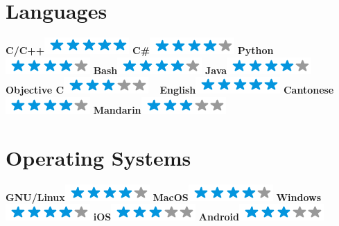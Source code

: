 \documentclass[]{friggeri-cv}
\begin{document}
\begin{aside}
  \section{Languages}
    \textbf{C/C++}\includegraphics[scale=0.40]{img/5stars.png}
    \textbf{C\#}\includegraphics[scale=0.40]{img/4stars.png}
    \textbf{Python}\includegraphics[scale=0.40]{img/4stars.png}
    \textbf{Bash}\includegraphics[scale=0.40]{img/4stars.png}
    \textbf{Java}\includegraphics[scale=0.40]{img/4stars.png}
    \textbf{Objective C}\includegraphics[scale=0.40]{img/3stars.png}
    ~
    \textbf{English}\includegraphics[scale=0.40]{img/5stars.png}
    \textbf{Cantonese}\includegraphics[scale=0.40]{img/4stars.png}
    \textbf{Mandarin}\includegraphics[scale=0.40]{img/3stars.png}
    ~
  \section{Operating Systems}
    \textbf{GNU/Linux}\includegraphics[scale=0.40]{img/4stars.png}
    \textbf{MacOS}\includegraphics[scale=0.40]{img/4stars.png}
    \textbf{Windows}\includegraphics[scale=0.40]{img/4stars.png}
    \textbf{iOS}\includegraphics[scale=0.40]{img/3stars.png}
    \textbf{Android}\includegraphics[scale=0.40]{img/3stars.png}
    ~

\end{aside}
\end{document}
